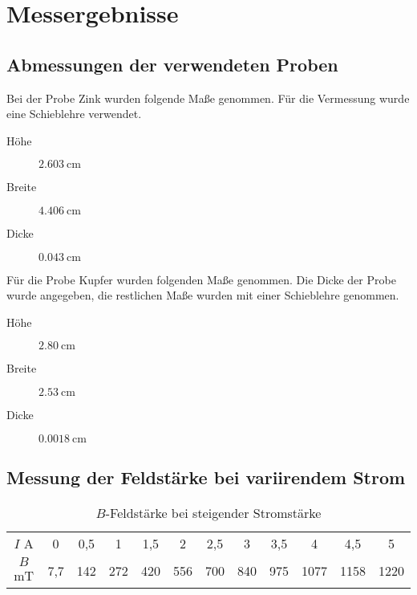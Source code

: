 \section{Messergebnisse}

\subsection{Abmessungen der verwendeten Proben}

Bei der Probe Zink wurden folgende Maße genommen.
Für die Vermessung wurde eine Schieblehre verwendet.

\begin{description}
  \item[Höhe] $\SI{2,603}{\centi\meter}$
  \item[Breite] $\SI{4,406}{\centi\meter}$
  \item[Dicke] $\SI{0,043}{\centi\meter}$
\end{description}

Für die Probe Kupfer wurden folgenden Maße genommen.
Die Dicke der Probe wurde angegeben, die restlichen Maße wurden mit einer
Schieblehre genommen.

\begin{description}
  \item[Höhe] $\SI{2,80}{\centi\meter}$
  \item[Breite] $\SI{2,53}{\centi\meter}$
  \item[Dicke] $\SI{0,0018}{\centi\meter}$
\end{description}

\subsection{Messung der Feldstärke bei variirendem Strom}

\begin{table}
 \centering
 \label{tab:Messergebnisse_Feldstärke_Isteigt}
 \begin{tabular}[width=\textwidth]{S| S[table-format=1.1] S[table-format=3.1] S[table-format=3.0] S[table-format=3.1] S[table-format=3.0] S[table-format=3.1] S[table-format=3.0] S[table-format=3.1] S[table-format=4.0] S[table-format=4.1] S[table-format=4.0]}
     \midrule
      $I$  \si{\ampere} & 0 & 0,5 & 1 & 1,5 & 2 & 2,5 & 3 & 3,5 & 4 & 4,5 & 5 \\
      $B$  \si{\milli\tesla} & 7,7 & 142 & 272 & 420 & 556 & 700 & 840 & 975 & 1077 & 1158 & 1220 \\
      \bottomrule
\end{tabular}
  \caption{$B$-Feldstärke bei steigender Stromstärke}
\end{table}


